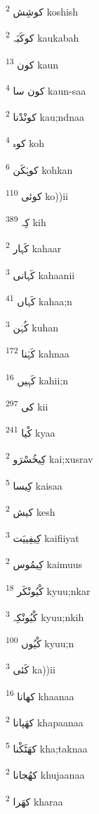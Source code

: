 \documentclass[12pt]{article}
\begin{document}
\begin{RTL}
\begin{multicols}{5}
{\ur کوشِش}   \textsuperscript{2} koshish

{\ur کوکَبَہ}   \textsuperscript{2} kaukabah

{\ur کون}   \textsuperscript{13} kaun

{\ur کون سا}   \textsuperscript{4} kaun-saa

{\ur کونْدْنا}   \textsuperscript{2} kau;ndnaa

{\ur کوہ}   \textsuperscript{4} koh

{\ur کوہْکَن}   \textsuperscript{6} kohkan

{\ur کوئی}   \textsuperscript{110} ko))ii

{\ur کِہ}   \textsuperscript{389} kih

{\ur کَہار}   \textsuperscript{2} kahaar

{\ur کَہانی}   \textsuperscript{3} kahaanii

{\ur کَہاں}   \textsuperscript{41} kahaa;n

{\ur کُہَن}   \textsuperscript{3} kuhan

{\ur کَہْنا}   \textsuperscript{172} kahnaa

{\ur کَہِیں}   \textsuperscript{16} kahii;n

{\ur کی}   \textsuperscript{297} kii

{\ur کْیا}   \textsuperscript{241} kyaa

{\ur کِیخُسْرَو}   \textsuperscript{2} kai;xusrav

{\ur کِیسا}   \textsuperscript{5} kaisaa

{\ur کیش}   \textsuperscript{2} kesh

{\ur کِیفِییَت}   \textsuperscript{3} kaifiiyat

{\ur کِیمُوس}   \textsuperscript{2} kaimuus

{\ur کْیُونْکَر}   \textsuperscript{18} kyuu;nkar

{\ur کْیُونْکِہ}   \textsuperscript{3} kyuu;nkih

{\ur کْیُوں}   \textsuperscript{100} kyuu;n

{\ur کَئی}   \textsuperscript{3} ka))ii

{\ur کھانا}   \textsuperscript{16} khaanaa

{\ur کھَپانا}   \textsuperscript{2} khapaanaa

{\ur کھَٹَکْنا}   \textsuperscript{5} kha;taknaa

{\ur کھُجانا}   \textsuperscript{2} khujaanaa

{\ur کھَرا}   \textsuperscript{2} kharaa


\end{multicols}
\end{RTL}
\end{document}
